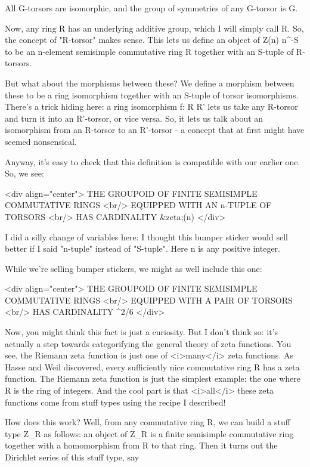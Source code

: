 All G-torsors are isomorphic, and the group of symmetries of any G-torsor is G.

Now, any ring R has an underlying additive group, which I will simply
call R.  So, the concept of "R-torsor" makes sense.  This lets us
define an object of Z(n) \times  n^{-S} to be an n-element
semisimple commutative ring R together with an S-tuple of R-torsors.

But what about the morphisms between these?  We define a morphism
between these to be a ring isomorphism together with an S-tuple of
torsor isomorphisms. There's a trick hiding here: a ring isomorphism
f: R \to  R' lets us take any R-torsor and turn it into an
R'-torsor, or vice versa.  So, it lets us talk about an isomorphism
from an R-torsor to an R'-torsor - a concept that at first might have
seemed nonsensical.

Anyway, it's easy to check that this definition is compatible with our
earlier one.  So, we see:

<div align="center">
THE GROUPOID OF FINITE SEMISIMPLE COMMUTATIVE RINGS <br/>
EQUIPPED WITH AN n-TUPLE OF TORSORS <br/>
HAS CARDINALITY &zeta;(n) </div>

I did a silly change of variables here: I thought this bumper sticker
would sell better if I said "n-tuple" instead of "S-tuple".  Here n is
any positive integer.

While we're selling bumper stickers, we might as well include this one:

<div align="center">
THE GROUPOID OF FINITE SEMISIMPLE COMMUTATIVE RINGS <br/>
EQUIPPED WITH A PAIR OF TORSORS <br/>
HAS CARDINALITY \pi ^{2}/6
</div>

Now, you might think this fact is just a curiosity.  But I don't think
so: it's actually a step towards categorifying the general theory of
zeta functions.  You see, the Riemann zeta function is just one of
<i>many</i> zeta functions.  As Hasse and Weil discovered, every
sufficiently nice commutative ring R has a zeta function.  The Riemann
zeta function is just the simplest example: the one where R is the
ring of integers.  And the cool part is that <i>all</i> these zeta
functions come from stuff types using the recipe I described!

How does this work?  Well, from any commutative ring R, we can build a
stuff type Z_{R} as follows: an object of Z_{R} is a
finite semisimple commutative ring together with a homomorphism from R
to that ring.  Then it turns out the Dirichlet series of this stuff
type, say


